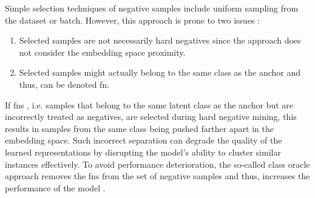 Simple selection techniques of negative samples include uniform sampling from the dataset or batch.
However, this approach is prone to two issues \citet{robinson_contrastive_2021,mining_potential_2024}:
\begin{enumerate}
    \item Selected samples are not necessarily hard negatives since the approach does not consider the embedding space proximity.
    \item Selected samples might actually belong to the same class as the anchor and thus, can be denoted \ac{fn}.
\end{enumerate}

If \acp{fn} \cite{grape_2024,curricular_weighting_2024,progcl_2022}, i.e. 
samples that belong to the same latent class as the anchor but are incorrectly treated as negatives, 
are selected during hard negative mining, 
this results in samples from the same class being pushed farther apart in the embedding space. 
Such incorrect separation can degrade the quality of the learned representations 
by disrupting the model's ability to cluster similar instances effectively.
To avoid performance deterioration, the so-called class oracle approach 
removes the \acp{fn} from the set of negative samples and thus, 
increases the performance of the model \citet{mochi_2020}.
